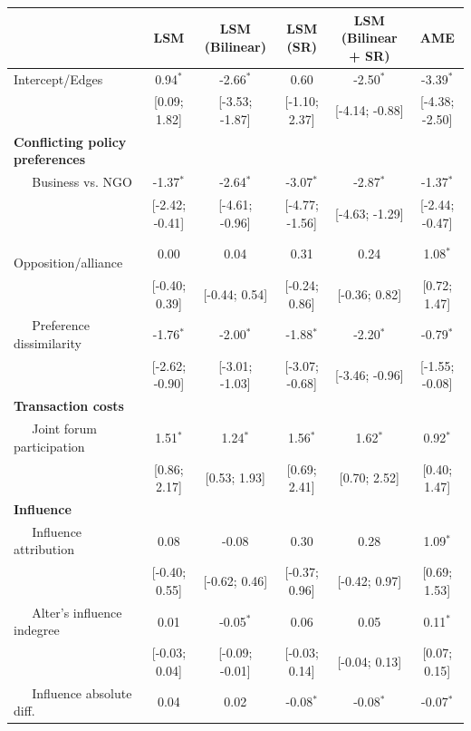 \documentclass[12pt,pdflatex]{elsarticle}
\begin{document}
\begin{table}[ht]
\centering
\begingroup\tiny
\begin{tabular}{lccccc}
   & LSM & LSM (Bilinear) & LSM (SR) & LSM (Bilinear + SR) & AME \\
  \hline
\hline
Intercept/Edges & 0.94$^{\ast}$ & -2.66$^{\ast}$ & 0.60 & -2.50$^{\ast}$ & -3.39$^{\ast}$ \\
   & [0.09; 1.82] & [-3.53; -1.87] & [-1.10; 2.37] & [-4.14; -0.88] & [-4.38; -2.50] \\
  \textbf{Conflicting policy preferences} &  &  &  &  &  \\
  $\;\;\;\;$ Business vs. NGO & -1.37$^{\ast}$ & -2.64$^{\ast}$ & -3.07$^{\ast}$ & -2.87$^{\ast}$ & -1.37$^{\ast}$ \\
   & [-2.42; -0.41] & [-4.61; -0.96] & [-4.77; -1.56] & [-4.63; -1.29] & [-2.44; -0.47] \\
  $\;\;\;\;$ Opposition/alliance & 0.00 & 0.04 & 0.31 & 0.24 & 1.08$^{\ast}$ \\
   & [-0.40; 0.39] & [-0.44; 0.54] & [-0.24; 0.86] & [-0.36; 0.82] & [0.72; 1.47] \\
  $\;\;\;\;$ Preference dissimilarity & -1.76$^{\ast}$ & -2.00$^{\ast}$ & -1.88$^{\ast}$ & -2.20$^{\ast}$ & -0.79$^{\ast}$ \\
   & [-2.62; -0.90] & [-3.01; -1.03] & [-3.07; -0.68] & [-3.46; -0.96] & [-1.55; -0.08] \\
  \textbf{Transaction costs} &  &  &  &  &  \\
  $\;\;\;\;$ Joint forum participation & 1.51$^{\ast}$ & 1.24$^{\ast}$ & 1.56$^{\ast}$ & 1.62$^{\ast}$ & 0.92$^{\ast}$ \\
   & [0.86; 2.17] & [0.53; 1.93] & [0.69; 2.41] & [0.70; 2.52] & [0.40; 1.47] \\
  \textbf{Influence} &  &  &  &  &  \\
  $\;\;\;\;$ Influence attribution & 0.08 & -0.08 & 0.30 & 0.28 & 1.09$^{\ast}$ \\
   & [-0.40; 0.55] & [-0.62; 0.46] & [-0.37; 0.96] & [-0.42; 0.97] & [0.69; 1.53] \\
  $\;\;\;\;$ Alter's influence indegree & 0.01 & -0.05$^{\ast}$ & 0.06 & 0.05 & 0.11$^{\ast}$ \\
   & [-0.03; 0.04] & [-0.09; -0.01] & [-0.03; 0.14] & [-0.04; 0.13] & [0.07; 0.15] \\
  $\;\;\;\;$ Influence absolute diff. & 0.04 & 0.02 & -0.08$^{\ast}$ & -0.08$^{\ast}$ & -0.07$^{\ast}$ \\

\end{tabular}
\end{table}
\end{document}
